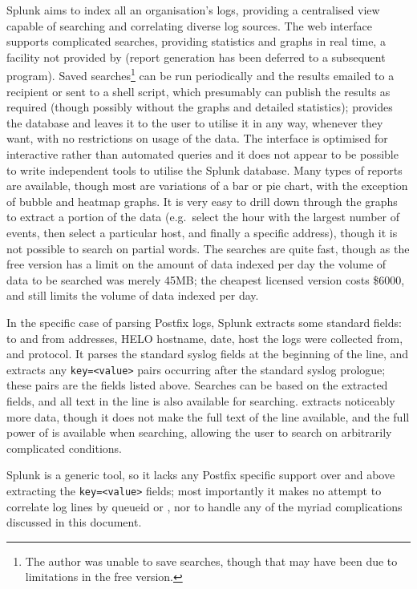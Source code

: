 \documentclass[a4paper,12pt,draft]{article}
\newcommand{\parsername}{\PLP{}}
\begin{document}
Splunk aims to index all an organisation's logs, providing a centralised
view capable of searching and correlating diverse log sources.  The web
interface supports complicated searches, providing statistics and graphs in
real time, a facility not provided by \parsername{} (report generation has
been deferred to a subsequent program).  Saved searches\footnote{The author
was unable to save searches, though that may have been due to limitations
in the free version.} can be run periodically and the results emailed to a
recipient or sent to a shell script, which presumably can publish the
results as required (though possibly without the graphs and detailed
statistics); \parsername{} provides the database and leaves it to the user
to utilise it in any way, whenever they want, with no restrictions on usage
of the data.  The interface is optimised for interactive rather than
automated queries and it does not appear to be possible to write
independent tools to utilise the Splunk database.  Many types of reports
are available, though most are variations of a bar or pie chart, with the
exception of bubble and heatmap graphs.  It is very easy to drill down
through the graphs to extract a portion of the data (e.g.\ select the hour
with the largest number of events, then select a particular host, and
finally a specific address), though it is not possible to search on partial
words.  The searches are quite fast, though as the free version has a limit
on the amount of data indexed per day the volume of data to be searched was
merely 45MB\@; the cheapest licensed version costs \$6000, and still limits
the volume of data indexed per day.

In the specific case of parsing Postfix logs, Splunk extracts some standard
fields: to and from addresses, HELO hostname, date, host the logs were
collected from, and protocol.  It parses the standard syslog fields at the
beginning of the line, and extracts any \texttt{key=<value>} pairs
occurring after the standard syslog prologue; these pairs are the fields
listed above.  Searches can be based on the extracted fields, and all text
in the line is also available for searching.  \parsername{} extracts
noticeably more data, though it does not make the full text of the line
available, and the full power of \SQL{} is available when searching,
allowing the user to search on arbitrarily complicated conditions.

Splunk is a generic tool, so it lacks any Postfix specific support over and
above extracting the \texttt{key=<value>} fields; most importantly it makes
no attempt to correlate log lines by queueid or \pid{}, nor to handle any
of the myriad complications discussed in this document.
\end{document}
